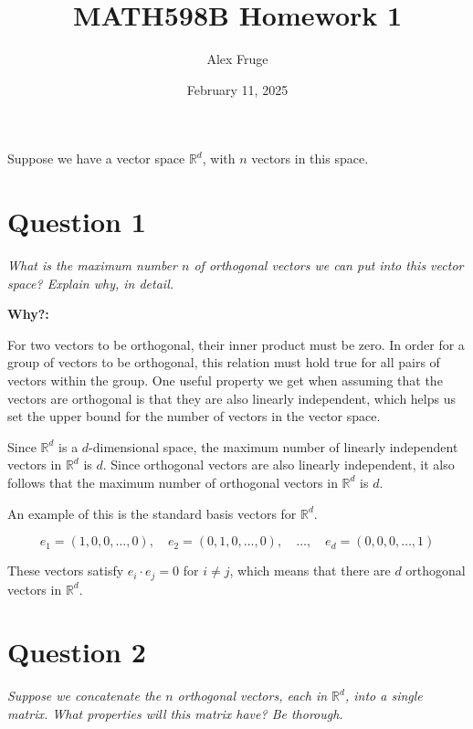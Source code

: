 \documentclass[hidelinks]{article}
\title{\textbf{MATH598B Homework 1}}
\author{Alex Fruge}
\date{February 11, 2025}
\begin{document}
	\hypersetup{bookmarksnumbered=true,}
	\maketitle

	
	\begin{Large}
			Suppose we have a vector space $\mathbb{R}^d$, with $n$ vectors in this space. 
	\end{Large}
	
	\section{Question 1}

	\textit{What is the maximum number $n$ of orthogonal vectors we can put into this vector space? Explain why, in detail.}\\
	
	{}
	
	\textbf{Why?:}
		
	For two vectors to be orthogonal, their inner product must be zero. In order for a group of vectors to be orthogonal, this relation must hold true for all pairs of vectors within the group. One useful property we get when assuming that the vectors are orthogonal is that they are also linearly independent, which helps us set the upper bound for the number of vectors in the vector space.
	
	Since $\mathbb{R}^d$ is a $d$-dimensional space, the maximum number of linearly independent vectors in $\mathbb{R}^d$ is $d$. Since orthogonal vectors are also linearly independent, it also follows that the maximum number of orthogonal vectors in $\mathbb{R}^d$ is $d$.
	
	An example of this is the standard basis vectors for $\mathbb{R}^d$. 
	
	\[e_1 = (1,0,0,\dots,0),\quad e_2 = (0,1,0,\dots,0),\quad\dots,\quad e_d = (0,0,0,\dots,1)\]
	
	These vectors satisfy $e_i \cdot e_j = 0$ for $i\ne j$, which means that there are $d$ orthogonal vectors in $\mathbb{R}^d$.
	
	\section{Question 2}
	
	\textit{Suppose we concatenate the $n$ orthogonal vectors, each in $\mathbb{R}^d$, into a single matrix. What properties will this matrix have? Be thorough.}
	
\end{document}
